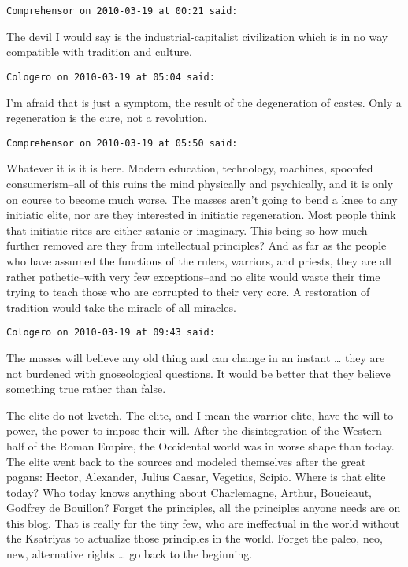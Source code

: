 \begin{footnotesize}
\begin{sffamily}
\hfill

\texttt{Comprehensor on 2010-03-19 at 00:21 said: }

The devil I would say is the industrial-capitalist civilization which is in no way compatible with tradition and culture.


\hfill

\texttt{Cologero on 2010-03-19 at 05:04 said: }

I'm afraid that is just a symptom, the result of the degeneration of castes. Only a regeneration is the cure, not a revolution.


\hfill

\texttt{Comprehensor on 2010-03-19 at 05:50 said: }

Whatever it is it is here. Modern education, technology, machines, spoonfed consumerism–all of this ruins the mind physically and psychically, and it is only on course to become much worse. The masses aren't going to bend a knee to any initiatic elite, nor are they interested in initiatic regeneration. Most people think that initiatic rites are either satanic or imaginary. This being so how much further removed are they from intellectual principles? And as far as the people who have assumed the functions of the rulers, warriors, and priests, they are all rather pathetic–with very few exceptions–and no elite would waste their time trying to teach those who are corrupted to their very core. A restoration of tradition would take the miracle of all miracles.


\hfill

\texttt{Cologero on 2010-03-19 at 09:43 said: }

The masses will believe any old thing and can change in an instant … they are not burdened with gnoseological questions. It would be better that they believe something true rather than false.

The elite do not kvetch. The elite, and I mean the warrior elite, have the will to power, the power to impose their will. After the disintegration of the Western half of the Roman Empire, the Occidental world was in worse shape than today. The elite went back to the sources and modeled themselves after the great pagans: Hector, Alexander, Julius Caesar, Vegetius, Scipio. Where is that elite today? Who today knows anything about Charlemagne, Arthur, Boucicaut, Godfrey de Bouillon? Forget the principles, all the principles anyone needs are on this blog. That is really for the tiny few, who are ineffectual in the world without the Ksatriyas to actualize those principles in the world. Forget the paleo, neo, new, alternative rights … go back to the beginning.



\end{sffamily}
\end{footnotesize}
